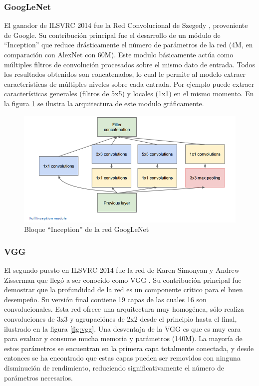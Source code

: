 \documentclass[a4paper,11pt,spanish]{book}
\begin{document}
	\subsubsection{GoogLeNet}
	  El ganador de ILSVRC 2014 fue la Red Convolucional de Szegedy \cite{Szegedy:Convolutions}, proveniente de Google. Su contribución principal fue el desarrollo de un 
	  módulo de ``Inception'' que reduce drásticamente el número de parámetros de la red (4M, en comparación con AlexNet con 60M). 
	  Este modulo básicamente actúa como múltiples filtros de convolución
	  procesados sobre el mismo dato de entrada. Todos los resultados obtenidos son concatenados, lo cual le permite al modelo extraer características de múltiples niveles sobre
	  cada entrada. Por ejemplo puede extraer características generales (filtros de 5x5) y locales (1x1) en el mismo momento. En la figura \ref{fig:inception} se ilustra la arquitectura
	  de este modulo gráficamente.

	  \begin{figure}[h]
	    \begin{center}
	    \includegraphics[width=0.6\linewidth]{./img/googlenet_inception_module.png}
	    \end{center}
	    \caption{Bloque ``Inception'' de la red GoogLeNet}
	    \label{fig:inception}
	  \end{figure}	  

	\subsubsection{VGG}
	  El segundo puesto en ILSVRC 2014 fue la red de Karen Simonyan y Andrew Zisserman que llegó a ser conocido como VGG \cite{SimonyanVGG}. 
	  Su contribución principal fue demostrar que la profundidad de
	  la red es un componente crítico para el buen desempeño. Su versión final contiene 19 capas de las cuales 16 son convolucionales. Esta red ofrece una arquitectura 
	  muy homogénea, sólo realiza convoluciones de 3x3 y agrupaciónes de 2x2 desde el principio hasta el final, ilustrado en la figura \ref{fig:vgg}.
	  Una desventaja de la VGG es que es muy cara para evaluar y consume mucha memoria y parámetros (140M). La mayoría de estos parámetros se encuentran en la primera
	  capa totalmente conectada, y desde entonces se ha encontrado que estas capas pueden ser removidos con ninguna disminución de rendimiento, reduciendo significativamente el
	  número de parámetros necesarios.
	  
\end{document}
